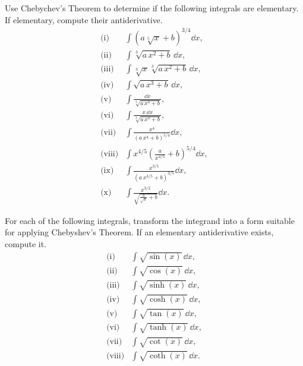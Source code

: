 Use Chebychev's Theorem to determine if the following integrals are elementary. If elementary, compute their antiderivative.
\allowdisplaybreaks
\begin{align*}
\text{(i)} & \int \left(a \sqrt[5]{x}+b\right)^{3/4} \dd x, \\
\text{(ii)} & \int \sqrt[3]{a\, x^2+b} \, \dd x, \\
\text{(iii)} & \int \sqrt[3]{x} \sqrt[3]{a\, x^2+b} \, \dd x, \\
\text{(iv)} & \int \sqrt{a\, x^3+b}\,\dd x, \\
\text{(v)} & \int \frac{\dd x}{\sqrt[3]{a\, x^3+b}}, \\
\text{(vi)} & \int \frac{x\,\dd x}{\sqrt[3]{a\, x^3+b}}, \\
\text{(vii)} & \int \frac{x^4}{\left(a\, x^4+b\right)^{5/4}} \dd x, \\
\text{(viii)} & \int x^{4/5} \left(\frac{a}{x^{4/5}}+b\right)^{5/4} \dd x, \\
\text{(ix)} & \int \frac{x^{3/5}}{\left(a\, x^{3/5}+b\right)^{3/5}} \dd x, \\
\text{(x)} & \int \frac{x^{3/2}}{\sqrt{\frac{a}{\sqrt{x}}+b}} \dd x.
\end{align*}

\medskip

For each of the following integrals, transform the integrand into a form suitable for 
applying Chebyshev's Theorem. If an elementary antiderivative exists, compute it.
\allowdisplaybreaks
\begin{align*}
\text{(i)} & \int \sqrt{\sin(x)}\, \dd x, \\
\text{(ii)} & \int \sqrt{\cos(x)}\, \dd x, \\
\text{(iii)} & \int \sqrt{\sinh(x)}\, \dd x, \\
\text{(iv)} & \int \sqrt{\cosh(x)}\, \dd x, \\
\text{(v)} & \int \sqrt{\tan(x)}\, \dd x, \\
\text{(vi)} & \int \sqrt{\tanh(x)}\, \dd x, \\
\text{(vii)} & \int \sqrt{\cot(x)}\, \dd x, \\
\text{(viii)} & \int \sqrt{\coth(x)}\, \dd x.
\end{align*}

\medskip

